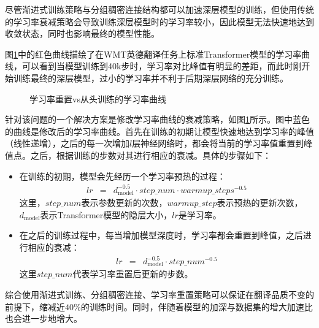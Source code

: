 \parinterval 尽管渐进式训练策略与分组稠密连接结构都可以加速深层模型的训练，但使用传统的学习率衰减策略会导致训练深层模型时的学习率较小，因此模型无法快速地达到收敛状态，同时也影响最终的模型性能。

\parinterval  图\ref{fig:15-17}中的红色曲线描绘了在WMT英德翻译任务上标准Transformer模型的学习率曲线，可以看到当模型训练到40k步时，学习率对比峰值有明显的差距，而此时刚开始训练最终的深层模型，过小的学习率并不利于后期深层网络的充分训练。

\begin{figure}[htp]
\centering

\caption{学习率重置vs从头训练的学习率曲线}
\label{fig:15-17}
\end{figure}

\parinterval 针对该问题的一个解决方案是修改学习率曲线的衰减策略，如图\ref{fig:15-17}所示。图中蓝色的曲线是修改后的学习率曲线。首先在训练的初期让模型快速地达到学习率的峰值（线性递增），之后的每一次增加$l$层神经网络时，都会将当前的学习率值重置到峰值点。之后，根据训练的步数对其进行相应的衰减。具体的步骤如下：

\begin{itemize}
\vspace{0.5em}
\item 在训练的初期，模型会先经历一个学习率预热的过程：
\begin{eqnarray}
lr &=& d_{\textrm{model}}^{-0.5}\cdot step\_num \cdot warmup\_steps^{-0.5}
\label{eq:15-49}
\end{eqnarray}
\noindent 这里，$step\_num$表示参数更新的次数，$warmup\_step$表示预热的更新次数，$d_{\textrm{model}}$表示Transformer模型的隐层大小，$lr$是学习率。
\vspace{0.5em}
\item 	在之后的训练过程中，每当增加模型深度时，学习率都会重置到峰值，之后进行相应的衰减：
\begin{eqnarray}
lr &=& d_{\textrm{model}}^{-0.5}\cdot step\_num^{-0.5}
\label{eq:15-50}
\end{eqnarray}
\noindent 这里$step\_num$代表学习率重置后更新的步数。
\vspace{0.5em}
\end{itemize}

\parinterval 综合使用渐进式训练、分组稠密连接、学习率重置策略可以保证在翻译品质不变的前提下，缩减近$40\%$的训练时间。同时，伴随着模型的加深与数据集的增大加速比也会进一步地增大。


